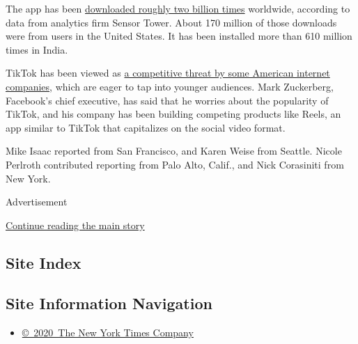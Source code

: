 The app has been
\href{https://sensortower.com/blog/tiktok-downloads-2-billion}{downloaded
roughly two billion times} worldwide, according to data from analytics
firm Sensor Tower. About 170 million of those downloads were from users
in the United States. It has been installed more than 610 million times
in India.

TikTok has been viewed as
\href{https://www.nytimes.com/2019/11/03/technology/tiktok-facebook-youtube.html}{a
competitive threat by some American internet companies}, which are eager
to tap into younger audiences. Mark Zuckerberg, Facebook's chief
executive, has said that he worries about the popularity of TikTok, and
his company has been building competing products like Reels, an app
similar to TikTok that capitalizes on the social video format.

Mike Isaac reported from San Francisco, and Karen Weise from Seattle.
Nicole Perlroth contributed reporting from Palo Alto, Calif., and Nick
Corasiniti from New York.

Advertisement

\protect\hyperlink{after-bottom}{Continue reading the main story}

\hypertarget{site-index}{%
\subsection{Site Index}\label{site-index}}

\hypertarget{site-information-navigation}{%
\subsection{Site Information
Navigation}\label{site-information-navigation}}

\begin{itemize}
\tightlist
\item
  \href{https://help.nytimes.com/hc/en-us/articles/115014792127-Copyright-notice}{©~2020~The
  New York Times Company}
\end{itemize}

